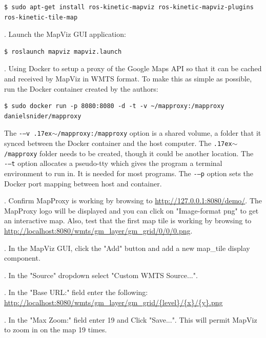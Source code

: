 \documentclass[runningheads,a4paper]{llncs}
\begin{document}
\begin{lstlisting}[frame=single,basicstyle=\ttfamily\footnotesize,breaklines=true]
$ sudo apt-get install ros-kinetic-mapviz ros-kinetic-mapviz-plugins ros-kinetic-tile-map
\end{lstlisting}

. Launch the MapViz GUI application:

\begin{lstlisting}[frame=single,basicstyle=\ttfamily\footnotesize,breaklines=true]
$ roslaunch mapviz mapviz.launch
\end{lstlisting}

. Using Docker to setup a proxy of the Google Maps API so that it can be cached and received by MapViz in WMTS format. To make this as simple as possible, run the Docker container created by the authors:

\begin{lstlisting}[frame=single,basicstyle=\ttfamily\footnotesize,breaklines=true]
$ sudo docker run -p 8080:8080 -d -t -v ~/mapproxy:/mapproxy danielsnider/mapproxy
\end{lstlisting}

The \texttt{-–v {\raise.17ex\hbox{$\scriptstyle\sim$}}/mapproxy:/mapproxy} option is a shared volume, a folder that it synced between the Docker container and the host computer. The \texttt{{\raise.17ex\hbox{$\scriptstyle\sim$}}/mapproxy} folder needs to be created, though it could be another location. The \texttt{-–t} option allocates a pseudo-tty which gives the program a terminal environment to run in. It is needed for most programs. The \texttt{-–p} option sets the Docker port mapping between host and container.

. Confirm MapProxy is working by browsing to \url{http://127.0.0.1:8080/demo/}. The MapProxy logo will be displayed and you can click on "Image-format png" to get an interactive map. Also, test that the first map tile is working by browsing to \url{http://localhost:8080/wmts/gm_layer/gm_grid/0/0/0.png}.

. In the MapViz GUI, click the "Add" button and add a new map\_tile display component.

. In the "Source" dropdown select "Custom WMTS Source...".

. In the "Base URL:" field enter the following: \url{http://localhost:8080/wmts/gm_layer/gm_grid/{level}/{x}/{y}.png}

. In the "Max Zoom:" field enter 19 and Click "Save...". This will permit MapViz to zoom in on the map 19 times. 
\end{document}
